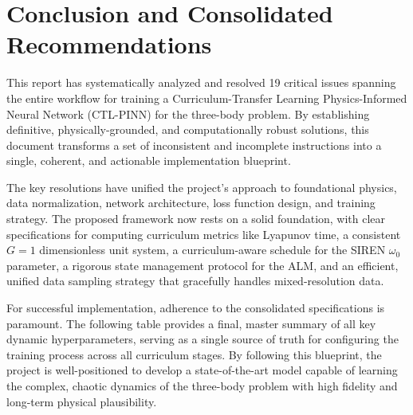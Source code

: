 \section*{Conclusion and Consolidated Recommendations}
This report has systematically analyzed and resolved 19 critical issues spanning the entire workflow for training a Curriculum-Transfer Learning Physics-Informed Neural Network (CTL-PINN) for the three-body problem. By establishing definitive, physically-grounded, and computationally robust solutions, this document transforms a set of inconsistent and incomplete instructions into a single, coherent, and actionable implementation blueprint.

The key resolutions have unified the project's approach to foundational physics, data normalization, network architecture, loss function design, and training strategy. The proposed framework now rests on a solid foundation, with clear specifications for computing curriculum metrics like Lyapunov time, a consistent $G=1$ dimensionless unit system, a curriculum-aware schedule for the SIREN $\omega_0$ parameter, a rigorous state management protocol for the ALM, and an efficient, unified data sampling strategy that gracefully handles mixed-resolution data.

For successful implementation, adherence to the consolidated specifications is paramount. The following table provides a final, master summary of all key dynamic hyperparameters, serving as a single source of truth for configuring the training process across all curriculum stages. By following this blueprint, the project is well-positioned to develop a state-of-the-art model capable of learning the complex, chaotic dynamics of the three-body problem with high fidelity and long-term physical plausibility.

